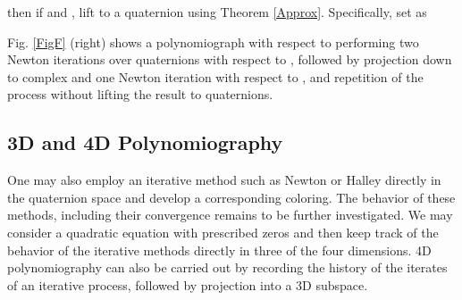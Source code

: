 \documentclass{article}
\theoremstyle{definition}
\begin{document}
then if  and , lift  to a quaternion using Theorem \ref{Approx}.
Specifically, set  as


Fig. \ref{FigF} (right) shows a polynomiograph with respect to performing two Newton iterations over quaternions with respect to ,  followed by  projection down to complex and one Newton iteration with  respect to , and repetition of the process without lifting the result to quaternions.

\subsection{3D and 4D Polynomiography}


One may also employ an iterative method such as Newton or Halley
directly in the quaternion space and develop a corresponding coloring.
The behavior of these methods, including their convergence
remains to be further investigated.  We may consider a quadratic equation with prescribed zeros and then keep track of the behavior of the iterative methods directly in three of the four dimensions.  4D polynomiography can also be carried out by recording the history of the iterates of an iterative process, followed by projection
into a 3D subspace.
\end{document}
